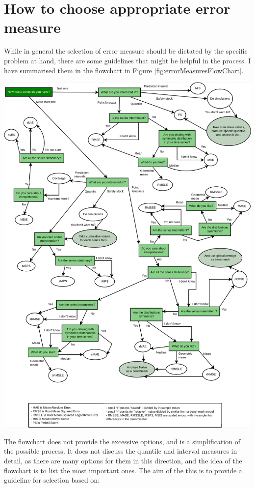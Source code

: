 \documentclass[
]{book}
\theoremstyle{definition}
\theoremstyle{definition}
\theoremstyle{definition}
\theoremstyle{definition}
\theoremstyle{remark}
\begin{document}
\hypertarget{errorMeasuresSelection}{%
\section{How to choose appropriate error measure}\label{errorMeasuresSelection}}

While in general the selection of error measure should be dictated by the specific problem at hand, there are some guidelines that might be helpful in the process. I have summarised them in the flowchart in Figure \ref{fig:errorMeasuresFlowChart}.

\includegraphics{./images/errorMeasuresFlowChart.pdf}

The flowchart does not provide the excessive options, and is a simplification of the possible process. It does not discuss the quantile and interval measures in detail, as there are many options for them in this direction, and the idea of the flowchart is to list the most important ones. The aim of the this is to provide a guideline for selection based on:
\end{document}
